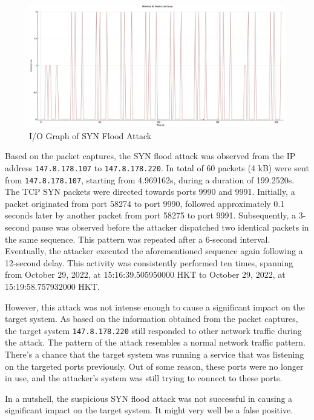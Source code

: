 \documentclass{article}
\begin{document}
    \begin{figure}[H]
        \centering
        \includegraphics[width=\textwidth]{image/107_220_syn_tcp.png}
        \caption{I/O Graph of SYN Flood Attack}
        \label{fig:syn-flood-io-graph}
    \end{figure}

    Based on the packet captures, the SYN flood attack was observed from the IP address \lstinline|147.8.178.107| to \lstinline|147.8.178.220|.
    In total of 60 packets (4 kB) were sent from \lstinline|147.8.178.107|, starting from 4.969162s, during a duration of 199.2520s.
    The TCP SYN packets were directed towards ports 9990 and 9991. 
    Initially, a packet originated from port 58274 to port 9990, followed approximately 0.1 seconds later by another packet from port 58275 to port 9991. 
    Subsequently, a 3-second pause was observed before the attacker dispatched two identical packets in the same sequence. 
    This pattern was repeated after a 6-second interval.
    Eventually, the attacker executed the aforementioned sequence again following a 12-second delay.
    This activity was consistently performed ten times, spanning from October 29, 2022, at 15:16:39.505950000 HKT to October 29, 2022, at 15:19:58.757932000 HKT.

    However, this attack was not intense enough to cause a significant impact on the target system.
    As based on the information obtained from the packet captures, the target system \lstinline|147.8.178.220| still responded to other network traffic during the attack.
    The pattern of the attack resembles a normal network traffic pattern. 
    There's a chance that the target system was running a service that was listening on the targeted ports previously.
    Out of some reason, these ports were no longer in use, and the attacker's system was still trying to connect to these ports.

    In a nutshell, the suspicious SYN flood attack was not successful in causing a significant impact on the target system.
    It might very well be a false positive.
\end{document}
